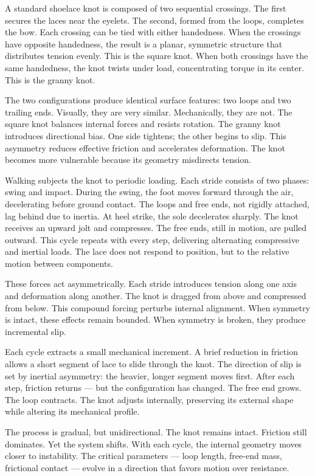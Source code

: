 A standard shoelace knot is composed of two sequential crossings. The first secures the laces near the eyelets. The second, formed from the loops, completes the bow. Each crossing can be tied with either handedness. When the crossings have opposite handedness, the result is a planar, symmetric structure that distributes tension evenly. This is the square knot. When both crossings have the same handedness, the knot twists under load, concentrating torque in its center. This is the granny knot.

The two configurations produce identical surface features: two loops and two trailing ends. Visually, they are very similar. Mechanically, they are not. The square knot balances internal forces and resists rotation. The granny knot introduces directional bias. One side tightens; the other begins to slip. This asymmetry reduces effective friction and accelerates deformation. The knot becomes more vulnerable because its geometry misdirects tension.

Walking subjects the knot to periodic loading. Each stride consists of two phases: swing and impact. During the swing, the foot moves forward through the air, decelerating before ground contact. The loops and free ends, not rigidly attached, lag behind due to inertia. At heel strike, the sole decelerates sharply. The knot receives an upward jolt and compresses. The free ends, still in motion, are pulled outward. This cycle repeats with every step, delivering alternating compressive and inertial loads. The lace does not respond to position, but to the relative motion between components.

These forces act asymmetrically. Each stride introduces tension along one axis and deformation along another. The knot is dragged from above and compressed from below. This compound forcing perturbs internal alignment. When symmetry is intact, these effects remain bounded. When symmetry is broken, they produce incremental slip.

Each cycle extracts a small mechanical increment. A brief reduction in friction allows a short segment of lace to slide through the knot. The direction of slip is set by inertial asymmetry: the heavier, longer segment moves first. After each step, friction returns — but the configuration has changed. The free end grows. The loop contracts. The knot adjusts internally, preserving its external shape while altering its mechanical profile.

The process is gradual, but unidirectional. The knot remains intact. Friction still dominates. Yet the system shifts. With each cycle, the internal geometry moves closer to instability. The critical parameters — loop length, free-end mass, frictional contact — evolve in a direction that favors motion over resistance.

